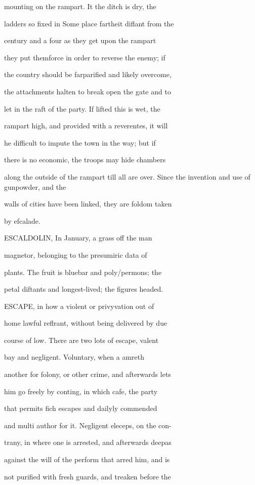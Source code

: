 \documentclass{article}
\begin{document}
mounting on the rampart. It the ditch is dry, the

ladders so fixed in Some place fartheit diflant from the

century and a four as they get upon the rampart

they put themforce in order to reverse the enemy; if

the country should be farparified and likely overcome,

the attachments halten to break open the gate and to

let in the raft of the party. If lifted this is wet, the

rampart high, and provided with a reverentes, it will

he difficult to impute the town in the way; but if

there is no economic, the troops may hide chambers

along the outside of the rampart till all are over. Since the invention and use of gunpowder, and the

walls of cities have been linked, they are foldom taken

by efcalade.

ESCALDOLIN, In January, a grass off the man

magnetor, belonging to the presumiric data of

plants. The fruit is bluebar and poly/permons; the

petal diftants and longest-lived; the figures headed.

ESCAPE, in how a violent or privyvation out of

home lawful reflrant, without being delivered by due

course of low. There are two lots of escape, valent

bay and negligent. Voluntary, when a amreth

another for folony, or other crime, and afterwards lets

him go freely by conting, in which cafe, the party

that permits fich escapes and dailyly commended

and multi author for it. Negligent eleceps, on the con-

trany, in where one is arrested, and afterwards deepas

against the will of the perform that arred him, and is

not purified with fresh guards, and treaken before the
\end{document}
